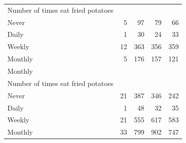 \documentclass{article}
\begin{document}
\begin{table}[!h]
{\begin{tabular}{lllll}
			\multicolumn{1}{l}{\hspace{4em}Number of times eat fried potatoes} &
			\multicolumn{1}{|r}{} &
			\multicolumn{1}{r}{} &
			\multicolumn{1}{r}{} &
			\multicolumn{1}{r}{} \\
			\multicolumn{1}{l}{\hspace{5em}Never} &
			\multicolumn{1}{|r}{5} &
			\multicolumn{1}{r}{97} &
			\multicolumn{1}{r}{79} &
			\multicolumn{1}{r}{66} \\
			\multicolumn{1}{l}{\hspace{5em}Daily} &
			\multicolumn{1}{|r}{1} &
			\multicolumn{1}{r}{30} &
			\multicolumn{1}{r}{24} &
			\multicolumn{1}{r}{33} \\
			\multicolumn{1}{l}{\hspace{5em}Weekly} &
			\multicolumn{1}{|r}{12} &
			\multicolumn{1}{r}{363} &
			\multicolumn{1}{r}{356} &
			\multicolumn{1}{r}{359} \\
			\multicolumn{1}{l}{\hspace{5em}Monthly} &
			\multicolumn{1}{|r}{5} &
			\multicolumn{1}{r}{176} &
			\multicolumn{1}{r}{157} &
			\multicolumn{1}{r}{121} \\
			\multicolumn{1}{l}{\hspace{3em}Monthly} &
			\multicolumn{1}{|r}{} &
			\multicolumn{1}{r}{} &
			\multicolumn{1}{r}{} &
			\multicolumn{1}{r}{} \\
			\multicolumn{1}{l}{\hspace{4em}Number of times eat fried potatoes} &
			\multicolumn{1}{|r}{} &
			\multicolumn{1}{r}{} &
			\multicolumn{1}{r}{} &
			\multicolumn{1}{r}{} \\
			\multicolumn{1}{l}{\hspace{5em}Never} &
			\multicolumn{1}{|r}{21} &
			\multicolumn{1}{r}{387} &
			\multicolumn{1}{r}{346} &
			\multicolumn{1}{r}{242} \\
			\multicolumn{1}{l}{\hspace{5em}Daily} &
			\multicolumn{1}{|r}{1} &
			\multicolumn{1}{r}{48} &
			\multicolumn{1}{r}{32} &
			\multicolumn{1}{r}{35} \\
			\multicolumn{1}{l}{\hspace{5em}Weekly} &
			\multicolumn{1}{|r}{21} &
			\multicolumn{1}{r}{555} &
			\multicolumn{1}{r}{617} &
			\multicolumn{1}{r}{583} \\
			\multicolumn{1}{l}{\hspace{5em}Monthly} &
			\multicolumn{1}{|r}{33} &
			\multicolumn{1}{r}{799} &
			\multicolumn{1}{r}{902} &
			\multicolumn{1}{r}{747} \\

\end{tabular}}
\end{table}
\end{document}
